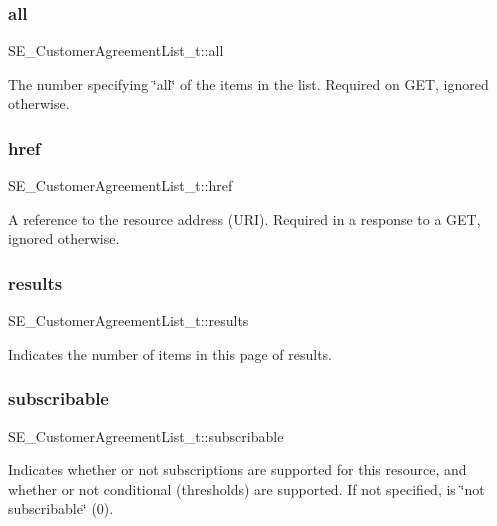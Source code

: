 \subsubsection{\texorpdfstring{all}{all}}
{\footnotesize\ttfamily S\+E\+\_\+\+Customer\+Agreement\+List\+\_\+t\+::all}

The number specifying \char`\"{}all\char`\"{} of the items in the list. Required on G\+ET, ignored otherwise. \mbox{\label{group__CustomerAgreementList_ga348f726fc82b6d4af27eb7766a105ab4}} 
\subsubsection{\texorpdfstring{href}{href}}
{\footnotesize\ttfamily S\+E\+\_\+\+Customer\+Agreement\+List\+\_\+t\+::href}

A reference to the resource address (U\+RI). Required in a response to a G\+ET, ignored otherwise. \mbox{\label{group__CustomerAgreementList_ga6829ab0344621b1f9cd85785fd0b972e}} 
\subsubsection{\texorpdfstring{results}{results}}
{\footnotesize\ttfamily S\+E\+\_\+\+Customer\+Agreement\+List\+\_\+t\+::results}

Indicates the number of items in this page of results. \mbox{\label{group__CustomerAgreementList_ga2ef2422ab3fb511245e3411e4f267c4a}} 
\subsubsection{\texorpdfstring{subscribable}{subscribable}}
{\footnotesize\ttfamily S\+E\+\_\+\+Customer\+Agreement\+List\+\_\+t\+::subscribable}

Indicates whether or not subscriptions are supported for this resource, and whether or not conditional (thresholds) are supported. If not specified, is \char`\"{}not subscribable\char`\"{} (0). 